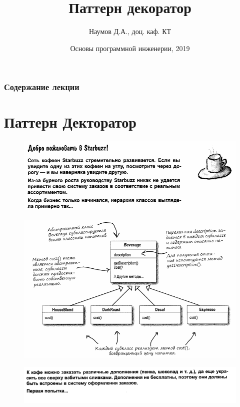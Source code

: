 \documentclass{beamer}
\title[Software Design]{Паттерн декоратор}
\author{Наумов Д.А., доц. каф. КТ}
\date[03.12.2019] {Основы программной инженерии, 2019}
\begin{document}
\begin{frame}
  \titlepage
\end{frame}
  
\begin{frame}
  \frametitle{Содержание лекции}
  \tableofcontents  
\end{frame}

\section{Паттерн Декторатор}

\begin{frame}
\begin{figure}[h]
\centering
\includegraphics[scale=0.6]{images/lec10-pic01.png}
\label{pic-sort}
\end{figure}
\end{frame}

\begin{frame}
\begin{figure}[h]
\centering
\includegraphics[scale=0.6]{images/lec10-pic02.png}
\label{pic-sort}
\end{figure}
\end{frame}

\begin{frame}
\begin{figure}[h]
\centering
\includegraphics[scale=0.6]{images/lec10-pic03.png}
\label{pic-sort}
\end{figure}
\end{frame}
\end{document}
